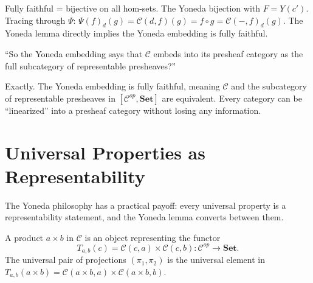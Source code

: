 \begin{prooflog}
           {Fully faithful = bijective on all hom-sets.}
           {The Yoneda bijection with $F = Y(c')$.}
           {Tracing through $\Psi$: $\Psi(f)_d(g) = \mathcal{C}(d,f)(g) = f \circ g = \mathcal{C}(-,f)_d(g)$.}
           {The Yoneda lemma directly implies the Yoneda embedding is fully faithful.}
\end{prooflog}

\begin{dialog}
``So the Yoneda embedding says that $\mathcal{C}$ embeds into its presheaf category
as the full subcategory of representable presheaves?''

Exactly. The Yoneda embedding is fully faithful, meaning $\mathcal{C}$ and the
subcategory of representable presheaves in $[\mathcal{C}^{op}, \mathbf{Set}]$ are
equivalent. Every category can be ``linearized'' into a presheaf category without
losing any information.
\end{dialog}

\section{Universal Properties as Representability}

The Yoneda philosophy has a practical payoff: every universal property is a
representability statement, and the Yoneda lemma converts between them.

A product $a \times b$ in $\mathcal{C}$ is an object representing the functor
\[
  T_{a,b}(c) = \mathcal{C}(c, a) \times \mathcal{C}(c, b) : \mathcal{C}^{op} \to \mathbf{Set}.
\]
The universal pair of projections $(\pi_1, \pi_2)$ is the universal element in
$T_{a,b}(a \times b) = \mathcal{C}(a\times b, a) \times \mathcal{C}(a\times b, b)$.

